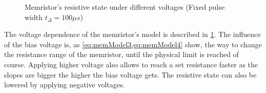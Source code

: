 \begin{figure}[H]
  \centering
  
  \caption{Memristor's resistive state under different voltages (Fixed pulse width $t_{\Delta}=100\mu s$)}
  \label{graph:voltChange}
\end{figure}

The voltage dependence of the memristor's model is described in \cref{graph:voltChange}. The influence of the bias voltage is, as \cref{eq:memModel3,eq:memModel4} show, the way to change the resistance range of the memristor, until the physical limit is reached of course. Applying higher voltage also allows to reach a set resistance faster as the slopes are bigger the higher the bias voltage gets. The resistive state can also be lowered by applying negative voltages.%


